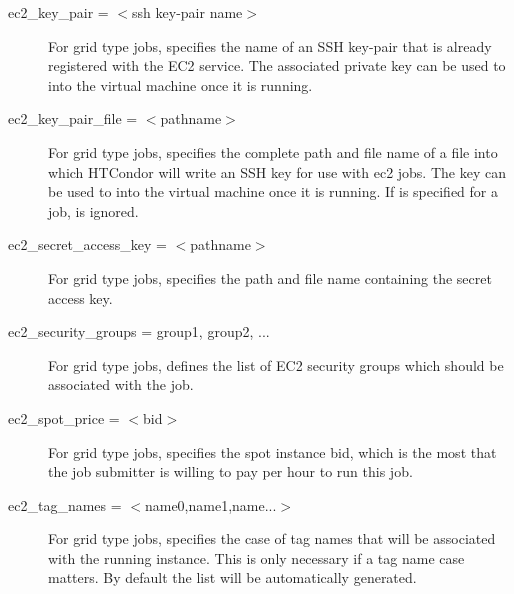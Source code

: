 \begin{description}
\item[ec2\_key\_pair = $<$ssh key-pair name$>$]
For grid type  jobs, 
specifies the name of an SSH key-pair that is already registered
with the EC2 service.
The associated private key can be used to  into the
virtual machine once it is running.


\item[ec2\_key\_pair\_file = $<$pathname$>$]
For grid type  jobs, 
specifies the complete path and file name of a file into which 
HTCondor will write an SSH key for use with ec2 jobs. 
The key can be used to  into the
virtual machine once it is running.
If  is specified for a job,
 is ignored.


\label{condor-submit-ec2-access-key}
\item[ec2\_secret\_access\_key = $<$pathname$>$]
For grid type  jobs,
specifies the path and file name containing the secret access key.


\label{condor-submit-ec2-security-groups}
\item[ec2\_security\_groups = group1, group2, ...]
For grid type  jobs, 
defines the list of EC2 security groups which
should be associated with the job.


\label{condor-submit-ec2-spot-price}
\item[ec2\_spot\_price = $<$bid$>$]
For grid type  jobs, 
specifies the spot instance bid, which is the most that the job submitter
is willing to pay per hour to run this job.


\label{condor-submit-ec2-tag-names}
\item[ec2\_tag\_names = $<$name0,name1,name...$>$]
For grid type  jobs, 
specifies the case of tag names that will be associated with the
running instance.
This is only necessary if a tag name case matters.
By default the list will be automatically generated.


\end{description}
